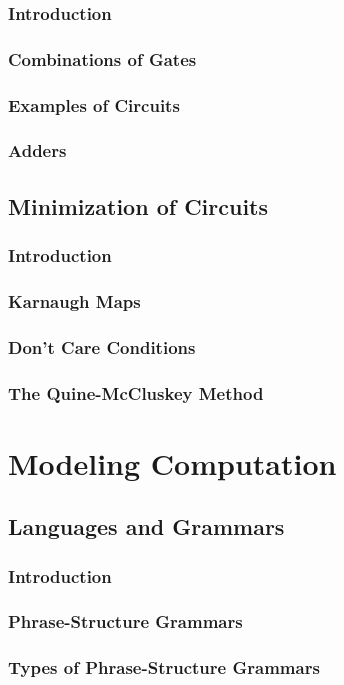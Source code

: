 \documentclass[11pt]{book}
\begin{document}
  \subsection{Introduction}
  \subsection{Combinations of Gates}
  \subsection{Examples of Circuits}
  \subsection{Adders}
  
 \section{Minimization of Circuits}
  \subsection{Introduction}
  \subsection{Karnaugh Maps}
  \subsection{Don't Care Conditions}
  \subsection{The Quine-McCluskey Method}

\chapter{Modeling Computation}
 \section{Languages and Grammars}
  \subsection{Introduction}
  \subsection{Phrase-Structure Grammars}
  \subsection{Types of Phrase-Structure Grammars}
\end{document}
